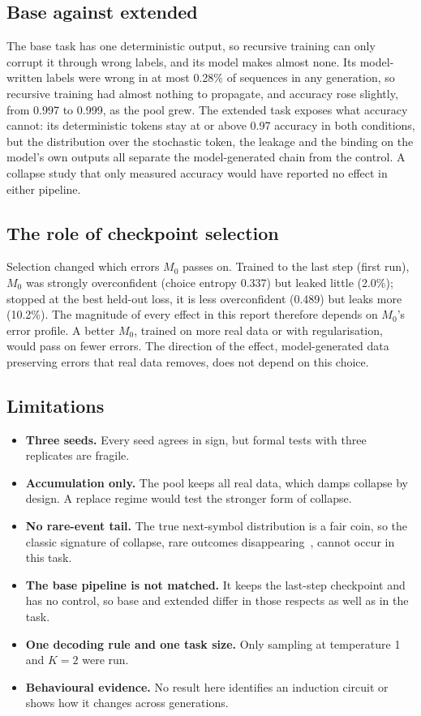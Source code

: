 \documentclass[11pt,a4paper]{article}
\begin{document}
\subsection{Base against extended}
The base task has one deterministic output, so recursive training can only
corrupt it through wrong labels, and its model makes almost none.
Its model-written labels were wrong in at most 0.28\% of sequences in any generation, so recursive training had almost nothing to propagate, and accuracy rose slightly, from 0.997 to 0.999, as the pool grew. The extended task exposes what accuracy cannot: its
deterministic tokens stay at or above 0.97 accuracy in both conditions, but the
distribution over the stochastic token, the leakage and the binding on the
model's own outputs all separate the model-generated chain from the control.
A collapse study that only measured accuracy would have reported no effect in
either pipeline.

\subsection{The role of checkpoint selection}
Selection changed which errors $M_0$ passes on. Trained to the last step
(first run), $M_0$ was strongly overconfident (choice entropy 0.337) but leaked
little (2.0\%); stopped at the best held-out loss, it is less overconfident
(0.489) but leaks more (10.2\%). The magnitude of every effect in this report
therefore depends on $M_0$'s error profile. A better $M_0$, trained on more
real data or with regularisation, would pass on fewer errors. The direction of
the effect, model-generated data preserving errors that real data removes,
does not depend on this choice.

\subsection{Limitations}
\begin{itemize}[leftmargin=1.4em]
  \item \textbf{Three seeds.} Every seed agrees in sign, but formal tests with
        three replicates are fragile.
  \item \textbf{Accumulation only.} The pool keeps all real data, which
        damps collapse by design. A replace regime would test the stronger
        form of collapse.
  \item \textbf{No rare-event tail.} The true next-symbol distribution is a
        fair coin, so the classic signature of collapse, rare outcomes
        disappearing~\cite{shumailov2024}, cannot occur in this task.
  \item \textbf{The base pipeline is not matched.} It keeps the last-step
        checkpoint and has no control, so base and extended differ in those
        respects as well as in the task.
  \item \textbf{One decoding rule and one task size.} Only sampling at
        temperature 1 and $K=2$ were run.
  \item \textbf{Behavioural evidence.} No result here identifies an
        induction circuit or shows how it changes across generations.
\end{itemize}
\end{document}
